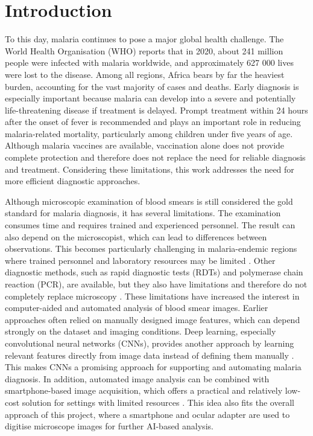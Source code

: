 \chapter{Introduction}
\label{chap:introduction}

To this day, malaria continues to pose a major global health challenge. The World Health Organisation (WHO) reports that in 2020, about 241 million people were infected with malaria worldwide, and approximately 627 000 lives were lost to the disease\cite{WHO2021Report}. Among all regions, Africa bears by far the heaviest burden, accounting for the vast majority of cases and deaths\cite{WHO2021Report}.
Early diagnosis is especially important because malaria can develop into a severe and potentially life-threatening disease if treatment is delayed. Prompt treatment within 24 hours after the onset of fever is recommended and plays an important role in reducing malaria-related mortality, particularly among children under five years of age\cite{Maturana2022}.
Although malaria vaccines are available, vaccination alone does not provide complete protection and therefore does not replace the need for reliable diagnosis and treatment\cite{Maturana2022}. Considering these limitations, this work addresses the need for more efficient diagnostic approaches.

Although microscopic examination of blood smears is still considered the gold standard for malaria diagnosis, it has several limitations. The examination consumes time and requires trained and experienced personnel. The result can also depend on the microscopist, which can lead to differences between observations. This becomes particularly challenging in malaria-endemic regions where trained personnel and laboratory resources may be limited \cite{Maturana2022,Rajaraman2019}. Other diagnostic methods, such as rapid diagnostic tests (RDTs) and polymerase chain reaction (PCR), are available, but they also have limitations and therefore do not completely replace microscopy \cite{Maturana2022}.
These limitations have increased the interest in computer-aided and automated analysis of blood smear images. Earlier approaches often relied on manually designed image features, which can depend strongly on the dataset and imaging conditions. Deep learning, especially convolutional neural networks (CNNs), provides another approach by learning relevant features directly from image data instead of defining them manually \cite{Rajaraman2019,Rajaraman2018}. This makes CNNs a promising approach for supporting and automating malaria diagnosis. In addition, automated image analysis can be combined with smartphone-based image acquisition, which offers a practical and relatively low-cost solution for settings with limited resources \cite{Maturana2022}. This idea also fits the overall approach of this project, where a smartphone and ocular adapter are used to digitise microscope images for further AI-based analysis.

